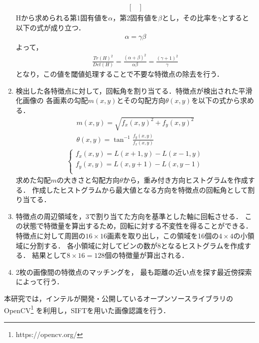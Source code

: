 \documentclass[11pt]{jreport}
\begin{document}
\begin{enumerate}
\begin{eqnarray}
\begin{bmatrix}
        \end{bmatrix}
    \end{eqnarray}
    Hから求められる第1固有値を$\alpha$，第2固有値を$\beta$とし，その比率を$\gamma$とすると以下の式が成り立つ．
    \begin{eqnarray}
        \alpha = \gamma\beta
    \end{eqnarray}
    よって，
    \begin{eqnarray}
        \frac{Tr(H)^2}{Det(H)} = \frac{(\alpha + \beta)^2}{\alpha\beta} = \frac{(\gamma + 1)^2}{\gamma}
    \end{eqnarray}
    となり，この値を閾値処理することで不要な特徴点の除去を行う．
    \item {} 検出した各特徴点に対して，回転角を割り当てる．特徴点が検出された平滑化画像の
    各画素の勾配$m(x,y)$とその勾配方向$\theta(x,y)$を以下の式から求める．
    \begin{eqnarray}
        m(x,y) = \sqrt{f_x(x,y)^2 + f_y(x,y)^2} \\ 
        \theta(x,y) = \tan^{-1}\frac{f_y(x,y)}{f_x(x,y)}
    \end{eqnarray}
    \begin{eqnarray}
        \begin{cases}
            {f_x(x,y) = L(x+1,y) - L(x-1,y)} \\
            {f_y(x,y) = L(x,y+1) - L(x,y-1)} \\
        \end{cases}
    \end{eqnarray}
    求めた勾配$m$の大きさと勾配方向$\theta$から，重み付き方向ヒストグラムを作成する．
    作成したヒストグラムから最大値となる方向を特徴点の回転角として割り当てる．
    \item {} 特徴点の周辺領域を，3で割り当てた方向を基準とした軸に回転させる．
    この状態で特徴量を算出するため，回転に対する不変性を得ることができる．
    特徴点に対して周囲の$16×16$画素を取り出し，この領域を16個の$4×4$の小領域に分割する．
    各小領域に対してビンの数が8となるヒストグラムを作成する．
    結果として$8×16=128$個の特徴量が算出される．
    \item {} 2枚の画像間の特徴点のマッチングを，
    最も距離の近い点を探す最近傍探索によって行う．
\end{enumerate}

本研究では，インテルが開発・公開しているオープンソースライブラリのOpenCV\footnote{https://opencv.org/}
を利用し，SIFTを用いた画像認識を行う．
\end{document}
